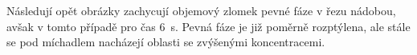 \vspace{-9mm}

Následují opět obrázky zachycují objemový zlomek pevné fáze v řezu nádobou, avšak v tomto případě pro čas \SI{6}{\second}. Pevná fáze je již poměrně rozptýlena, ale stále se pod míchadlem nacházejí oblasti se zvýšenými koncentracemi.

\newpage

\begin{figure}[h!]
  \begin{center}
  \qquad             

\end{center}
\end{figure}
